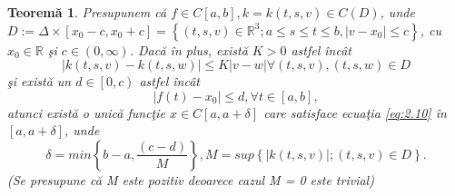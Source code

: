 \documentclass[a4paper,12pt,oneside]{report}
\newtheorem{theorem}{Teorem\u a}
\begin{document}
\begin{theorem}
Presupunem c\u{a} \(f\in C\left [ a,b \right ], k = k\left ( t,s,v \right ) \in C\left ( D \right )\), unde \(D := \Delta \times \left [ x_{0} - c, x_{0} + c \right ] = \left \{ \left ( t,s,v \right ) \in \mathbb{R}^{3} ; a \leq s\leq t\leq b, \left | v - x_{0} \right |\leq c\right \}\), cu \(x_{0} \in \mathbb{R}\) \c{s}i \(c\in \left ( 0, \infty  \right )\). Dac\u{a} \^{i}n plus, exist\u{a}  \(K > 0\) astfel \^{i}nc\^{a}t
\begin{displaymath}
\left | k\left ( t,s,v \right ) - k\left ( t,s,w \right )\right | \leq K \left | v - w \right | \forall \left ( t,s,v \right ), \left ( t,s,w \right ) \in D \label{eq:2.12} \tag{2.12}
\end{displaymath}
\c{s}i exist\u{a} un \(d \in \left [ 0,c \right )\) astfel \^{i}nc\^{a}t
\begin{displaymath}
\left | f\left ( t \right ) - x_{0}\right | \leq d, \forall t \in \left [ a,b \right ], \label{eq:2.13} \tag{2.13}
\end{displaymath}
atunci exist\u{a} o unic\u{a} func\c{t}ie  \(x\in C \left [ a, a + \delta  \right ]\) care satisface ecua\c{t}ia \ref{eq:2.10} \^{i}n  \(\left [ a, a + \delta  \right ]\), unde
\begin{displaymath}
\delta  = min \left \{ b-a, \frac{\left ( c-d \right )}{M} \right \}, M = sup \left \{ \left | k\left ( t,s,v \right ) \right |;\left ( t,s,v \right ) \in D \right \}.
\end{displaymath}
(Se presupune c\u{a} M este pozitiv deoarece cazul M = 0 este trivial)
\end{theorem}
\end{document}
